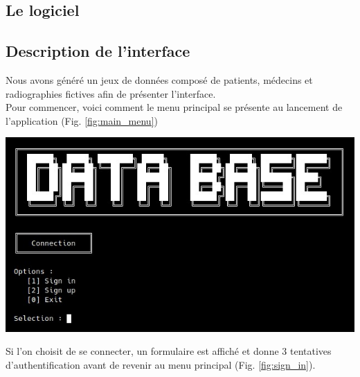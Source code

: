 \documentclass[12pt,a4paper]{article}
\newenvironment{Figure}
{\par\medskip\noindent\minipage{\linewidth}}
{\endminipage\par\medskip}
\begin{document}
	\begin{multicols}{2}
		
		\section{Le logiciel}
		
		\subsection{Description de l'interface}
		
		Nous avons généré un jeux de données composé de patients, médecins et radiographies fictives afin de présenter l'interface.\\
		
		Pour commencer, voici comment le menu principal se présente au lancement de l'application (Fig. \ref{fig:main_menu}) \\
		
		\begin{Figure}
			\centering
			\includegraphics[width=\linewidth]{images/walkthrough/entree.jpg}
			\label{fig:main_menu}
		\end{Figure}
		
		Si l'on choisit de se connecter, un formulaire est affiché et donne 3 tentatives d'authentification avant de revenir au menu principal (Fig. \ref{fig:sign_in}). \\
		

\end{multicols}
\end{document}
